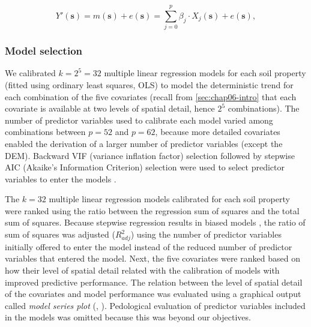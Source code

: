 \begin{equation}\label{eqn:chap06-lmm}
 Y'(\textbf{s}) = m(\textbf{s}) + e(\textbf{s}) 
                = \sum_{j=0}^{p} \beta_{j}\cdot X_{j}(\textbf{s}) + e(\textbf{s}),
\end{equation}


\subsubsection{Model selection}

We calibrated $k = 2^5 = 32$ multiple linear regression models for each soil property (fitted using ordinary 
least squares, OLS) to model the deterministic trend for each combination of the five covariates (recall from 
\autoref{sec:chap06-intro} that each covariate is available at two levels of spatial detail, hence $2^5$ 
combinations). The number of predictor variables used to calibrate each model varied among combinations 
between $p = 52$ and $p = 62$, because more detailed covariates enabled the derivation of a larger number of 
predictor variables (except the DEM). Backward VIF (variance inflation factor) selection followed by stepwise 
AIC (Akaike's Information Criterion) selection were used to select predictor variables to enter the models 
\cite{Samuel-RosaEtAl2014c, VenablesEtAl2002}.

The $k = 32$ multiple linear regression models calibrated for each soil property were ranked using the ratio 
between the regression sum of squares and the total sum of squares. Because stepwise regression results in 
biased models \cite{Harrell2001a}, the ratio of sum of squares was adjusted (${R}^{2}_{adj}$) using the number 
of predictor variables initially offered to enter the model instead of the reduced number of predictor 
variables that entered the model. Next, the five covariates were ranked based on how their level of spatial 
detail related with the calibration of models with improved predictive performance. The relation between the 
level of spatial detail of the covariates and model performance was evaluated using a graphical output called 
\emph{model series plot} (, \citet{Samuel-RosaEtAl2014c}). Pedological evaluation 
of predictor variables included in the models was omitted because this was beyond our objectives.

